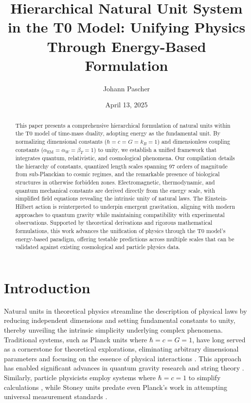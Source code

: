 \documentclass[twocolumn,aps,prl]{revtex4-2}
\begin{document}
	
	\title{Hierarchical Natural Unit System in the T0 Model: Unifying Physics Through Energy-Based Formulation}
	\author{Johann Pascher}
	\date{April 13, 2025}
	
	\begin{abstract}
		This paper presents a comprehensive hierarchical formulation of natural units within the T0 model of time-mass duality, adopting energy as the fundamental unit. By normalizing dimensional constants ($\hbar = c = G = k_B = 1$) and dimensionless coupling constants ($\alpha_{\text{EM}} = \alpha_W = \beta_T = 1$) to unity, we establish a unified framework that integrates quantum, relativistic, and cosmological phenomena. Our compilation details the hierarchy of constants, quantized length scales spanning 97 orders of magnitude from sub-Planckian to cosmic regimes, and the remarkable presence of biological structures in otherwise forbidden zones. Electromagnetic, thermodynamic, and quantum mechanical constants are derived directly from the energy scale, with simplified field equations revealing the intrinsic unity of natural laws. The Einstein-Hilbert action is reinterpreted to underpin emergent gravitation, aligning with modern approaches to quantum gravity while maintaining compatibility with experimental observations. Supported by theoretical derivations and rigorous mathematical formulations, this work advances the unification of physics through the T0 model's energy-based paradigm, offering testable predictions across multiple scales that can be validated against existing cosmological and particle physics data.
	\end{abstract}
	
	\maketitle
	
	\section{Introduction}
	\label{sec:introduction}
	
	Natural units in theoretical physics streamline the description of physical laws by reducing independent dimensions and setting fundamental constants to unity, thereby unveiling the intrinsic simplicity underlying complex phenomena. Traditional systems, such as Planck units where $\hbar = c = G = 1$, have long served as a cornerstone for theoretical explorations, eliminating arbitrary dimensional parameters and focusing on the essence of physical interactions \cite{Planck1899}. This approach has enabled significant advances in quantum gravity research \cite{Rovelli2004, Ashtekar2007} and string theory \cite{Greene1999}. Similarly, particle physicists employ systems where $\hbar = c = 1$ to simplify calculations \cite{Peskin1995}, while Stoney units predate even Planck’s work in attempting universal measurement standards \cite{Stoney1881}.
	
\end{document}
